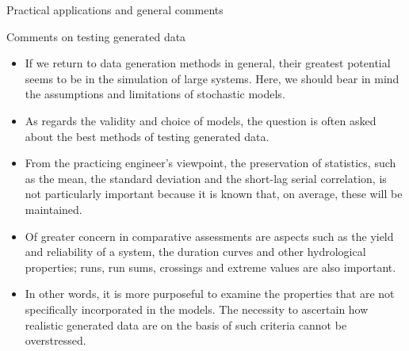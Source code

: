 \documentclass[8pt]{beamer}
\renewcommand{\emph}[1]{\textcolor{myorange}{#1}}
\begin{document}
\begin{frame}{Practical applications and general comments}
    \begin{block}{Comments on testing generated data}
    \end{block}
    \begin{itemize}
        \item If we return to \emph{data generation methods} in general, their greatest potential seems to be in the \emph{simulation of large systems}. Here, we should bear in mind the assumptions and limitations of stochastic models. 
        \item As regards the validity and choice of models, the question is often  asked about the best methods of testing generated data. 
        \item From the practicing engineer's viewpoint, the \emph{preservation of statistics}, such as the \emph{mean}, the \emph{standard deviation} and the \emph{short-lag serial correlation}, is not particularly important because it is known that, on average, these will be maintained. 
        \item Of greater concern in comparative assessments are aspects such as the \emph{yield and reliability} of a system, the \emph{duration curves} and other hydrological properties; \emph{runs}, \emph{run sums}, \emph{crossings} and \emph{extreme values} are also important. 
        \item In other words, it is more purposeful to examine the properties that are not specifically incorporated in the models. The necessity to ascertain how realistic generated data are on the basis of such criteria cannot be overstressed. 
    \end{itemize}
\end{frame}
\end{document}
